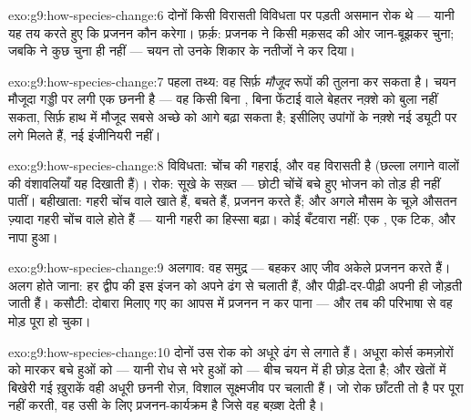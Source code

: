 \begin{solution}{exo:g9:how-species-change:6}
दोनों किसी विरासती विविधता पर पड़ती असमान रोक थे --- यानी यह तय करते हुए
कि प्रजनन कौन करेगा। फ़र्क़: प्रजनक ने किसी मक़सद की ओर जान-बूझकर चुना;
जबकि  ने कुछ चुना ही नहीं --- चयन तो उनके शिकार के नतीजों ने कर
दिया।
\end{solution}

\begin{solution}{exo:g9:how-species-change:7}
पहला तथ्य: वह सिर्फ़ \emph{मौजूद} रूपों की तुलना कर सकता है। चयन मौजूदा
गड्डी पर लगी एक छननी है --- वह किसी बिना , बिना फेंटाई वाले
बेहतर नक़्शे को बुला नहीं सकता, सिर्फ़ हाथ में मौजूद सबसे अच्छे को आगे
बढ़ा सकता है; इसीलिए उपांगों के नक़्शे नई ड्यूटी पर लगे मिलते हैं, नई
इंजीनियरी नहीं।
\end{solution}

\begin{solution}{exo:g9:how-species-change:8}
विविधता: चोंच की गहराई, और वह विरासती है (छल्ला लगाने वालों की वंशावलियाँ
यह दिखाती हैं)। रोक: सूखे के सख़्त  --- छोटी चोंचें बचे हुए भोजन को
तोड़ ही नहीं पातीं। बहीखाता: गहरी चोंच वाले  खाते हैं, बचते हैं,
प्रजनन करते हैं; और अगले मौसम के चूज़े औसतन ज़्यादा गहरी चोंच वाले होते
हैं --- यानी गहरी  का हिस्सा बढ़ा। कोई बँटवारा नहीं: एक ,
एक टिक, और नापा हुआ।
\end{solution}

\begin{solution}{exo:g9:how-species-change:9}
अलगाव: वह समुद्र --- बहकर आए जीव अकेले प्रजनन करते हैं। अलग होते जाना:
हर द्वीप की  इस इंजन को अपने ढंग से चलाती हैं, और
पीढ़ी-दर-पीढ़ी अपनी ही  जोड़ती जाती हैं। कसौटी: दोबारा मिलाए गए
 का आपस में प्रजनन न कर पाना --- और तब  की परिभाषा से वह
मोड़ पूरा हो चुका।
\end{solution}

\begin{solution}{exo:g9:how-species-change:10}
दोनों उस रोक को अधूरे ढंग से लगाते हैं। अधूरा कोर्स कमज़ोरों को मारकर बचे
हुओं को --- यानी रोध से भरे हुओं को --- बीच चयन में ही छोड़ देता है; और
खेतों में बिखेरी गई ख़ुराकें वही अधूरी छननी रोज़, विशाल सूक्ष्मजीव
 पर चलाती हैं। जो रोक छाँटती तो है पर पूरा नहीं करती, वह उसी के
लिए प्रजनन-कार्यक्रम है जिसे वह बख़्श देती है।
\end{solution}

